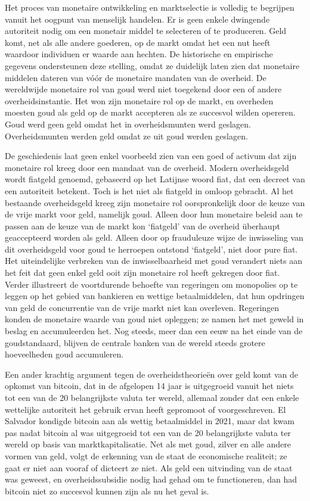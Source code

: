 \documentclass[
  a5paper,
  smalldemyvopaper,11pt,twoside,onecolumn,openright,extrafontsizes,
hidelinks]{memoir}
\begin{document}
Het proces van monetaire ontwikkeling en marktselectie is volledig te
begrijpen vanuit het oogpunt van menselijk handelen. Er is geen enkele
dwingende autoriteit nodig om een monetair middel te selecteren of te
produceren. Geld komt, net als alle andere goederen, op de markt omdat
het een nut heeft waardoor individuen er waarde aan hechten. De
historische en empirische gegevens ondersteunen deze stelling, omdat ze
duidelijk laten zien dat monetaire middelen dateren van vóór de
monetaire mandaten van de overheid. De wereldwijde monetaire rol van
goud werd niet toegekend door een of andere overheidsinstantie. Het won
zijn monetaire rol op de markt, en overheden moesten goud als geld op de
markt accepteren als ze succesvol wilden opereren. Goud werd geen geld
omdat het in overheidsmunten werd geslagen. Overheidsmunten werden geld
omdat ze uit goud werden geslagen.

De geschiedenis laat geen enkel voorbeeld zien van een goed of activum
dat zijn monetaire rol kreeg door een mandaat van de overheid. Modern
overheidsgeld wordt fiatgeld genoemd, gebaseerd op het Latijnse woord
fiat, dat een decreet van een autoriteit betekent. Toch is het niet als
fiatgeld in omloop gebracht. Al het bestaande overheidsgeld kreeg zijn
monetaire rol oorspronkelijk door de keuze van de vrije markt voor geld,
namelijk goud. Alleen door hun monetaire beleid aan te passen aan de
keuze van de markt kon `fiatgeld' van de overheid überhaupt geaccepteerd
worden als geld. Alleen door op frauduleuze wijze de inwisseling van dit
overheidsgeld voor goud te herroepen ontstond `fiatgeld', niet door pure
fiat. Het uiteindelijke verbreken van de inwisselbaarheid met goud
verandert niets aan het feit dat geen enkel geld ooit zijn monetaire rol
heeft gekregen door fiat. Verder illustreert de voortdurende behoefte
van regeringen om monopolies op te leggen op het gebied van bankieren en
wettige betaalmiddelen, dat hun opdringen van geld de concurrentie van
de vrije markt niet kan overleven. Regeringen konden de monetaire waarde
van goud niet opleggen; ze namen het met geweld in beslag en
accumuleerden het. Nog steeds, meer dan een eeuw na het einde van de
goudstandaard, blijven de centrale banken van de wereld steeds grotere
hoeveelheden goud accumuleren.

Een ander krachtig argument tegen de overheidstheorieën over geld komt
van de opkomst van bitcoin, dat in de afgelopen 14 jaar is uitgegroeid
vanuit het niets tot een van de 20 belangrijkste valuta ter wereld,
allemaal zonder dat een enkele wettelijke autoriteit het gebruik ervan
heeft gepromoot of voorgeschreven. El Salvador kondigde bitcoin aan als
wettig betaalmiddel in 2021, maar dat kwam pas nadat bitcoin al was
uitgegroeid tot een van de 20 belangrijkste valuta ter wereld op basis
van marktkapitalisatie. Net als met goud, zilver en alle andere vormen
van geld, volgt de erkenning van de staat de economische realiteit; ze
gaat er niet aan vooraf of dicteert ze niet. Als geld een uitvinding van
de staat was geweest, en overheidssubsidie nodig had gehad om te
functioneren, dan had bitcoin niet zo succesvol kunnen zijn als nu het
geval is.
\end{document}
